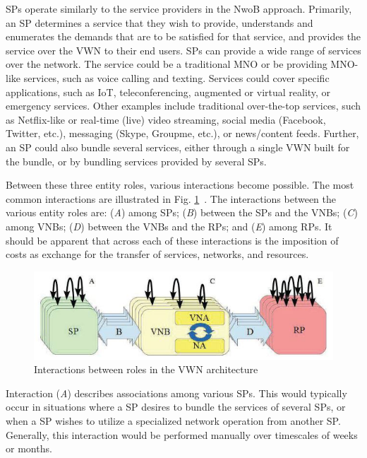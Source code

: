 \documentclass[12pt,dvipsnames]{report}
\begin{document}
SPs operate similarly to the service providers in the NwoB approach.  Primarily, an SP determines a service that they wish to provide, understands and enumerates the demands that are to be satisfied for that service, and provides the service over the VWN to their end users.  SPs can provide a wide range of services over the network.  The service could be a traditional MNO or be providing MNO-like services, such as voice calling and texting.  Services could cover specific applications, such as IoT, teleconferencing, augmented or virtual reality, or emergency services.  Other examples include traditional over-the-top services, such as Netflix-like or real-time (live) video streaming, social media (Facebook, Twitter, etc.), messaging (Skype, Groupme, etc.), or news/content feeds.  Further, an SP could also bundle several services, either through a single VWN built for the bundle, or by bundling services provided by several SPs.

Between these three entity roles, various interactions become possible.  The most common interactions are illustrated in Fig. \ref{fig:VWNArchitectureInteractions}~\cite{MJ_MECOMM_17}.  The interactions between the various entity roles are: (\emph{A}) among SPs; (\emph{B}) between the SPs and the VNBs; (\emph{C}) among VNBs; (\emph{D}) between the VNBs and the RPs; and (\emph{E}) among RPs.  It should be apparent that across each of these interactions is the imposition of costs as exchange for the transfer of services, networks, and resources.

\begin{figure}
	\centering
	\includegraphics[width=\linewidth]{VWNArchitectureInteractions}
	\caption[Interactions between roles in the VWN architecture]{\small Interactions between roles in the VWN architecture~\cite{MJ_MECOMM_17}}
	\label{fig:VWNArchitectureInteractions}
\end{figure}

Interaction (\emph{A}) describes associations among various SPs.  This would typically occur in situations where a SP desires to bundle the services of several SPs, or when a SP wishes to utilize a specialized network operation from another SP.  Generally, this interaction would be performed manually over timescales of weeks or months.
\end{document}
